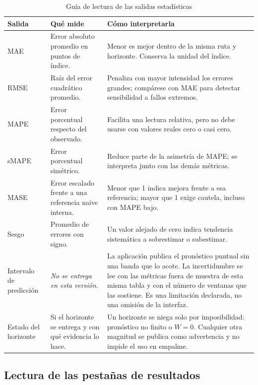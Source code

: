 \documentclass[12pt,letterpaper]{article}
\begin{document}
\begin{table}[H]
\centering
\caption{Guía de lectura de las salidas estadísticas}
\label{tab:manual_lectura_metricas}
\vspace{\baselineskip}
\small
\begin{tabularx}{\textwidth}{@{}p{2.5cm}p{4.2cm}Y@{}}
\toprule
\textbf{Salida} & \textbf{Qué mide} & \textbf{Cómo interpretarla} \\
\midrule
MAE & Error absoluto promedio en puntos de índice. & Menor es mejor dentro de la misma ruta y horizonte. Conserva la unidad del índice. \\
RMSE & Raíz del error cuadrático promedio. & Penaliza con mayor intensidad los errores grandes; compárese con MAE para detectar sensibilidad a fallos extremos. \\
MAPE & Error porcentual respecto del observado. & Facilita una lectura relativa, pero no debe usarse con valores reales cero o casi cero. \\
sMAPE & Error porcentual simétrico. & Reduce parte de la asimetría de MAPE; se interpreta junto con las demás métricas. \\
MASE & Error escalado frente a una referencia naive interna. & Menor que 1 indica mejora frente a esa referencia; mayor que 1 exige cautela, incluso con MAPE bajo. \\
Sesgo & Promedio de errores con signo. & Un valor alejado de cero indica tendencia sistemática a sobrestimar o subestimar. \\
Intervalo de predicción & \emph{No se entrega en esta versión.} & La aplicación publica el pronóstico puntual sin una banda que lo acote. La incertidumbre se lee con las métricas fuera de muestra de esta misma tabla y con el número de ventanas que las sostiene. Es una limitación declarada, no una omisión de la interfaz. \\
Estado del horizonte & Si el horizonte se entrega y con qué evidencia lo hace. & Un horizonte se niega solo por imposibilidad: pronóstico no finito o \(W=0\). Cualquier otra magnitud se publica como advertencia y no impide el uso en empalme. \\
\bottomrule
\end{tabularx}
\end{table}

\subsection{Lectura de las pestañas de resultados}
\end{document}
